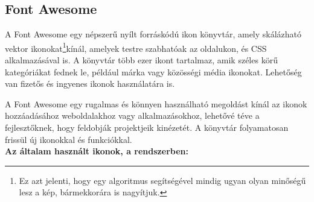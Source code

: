\documentclass[
]{thesis-ekf}
\theoremstyle{definition}
\theoremstyle{remark}
\begin{document}
	\subsection{Font Awesome}
	A Font Awesome egy népszerű nyílt forráskódú ikon könyvtár, amely skálázható vektor ikonokat\footnote{Ez azt jelenti, hogy egy algoritmus segítségével mindig ugyan olyan minőségű lesz a kép, bármekkorára is nagyítjuk.}kínál, amelyek testre szabhatóak az oldalukon, és CSS alkalmazásával is. A könyvtár több ezer ikont tartalmaz, amik széles körű kategóriákat fednek le, például márka vagy közösségi média ikonokat. Lehetőség van fizetős és ingyenes ikonok használatára is.
	
	A Font Awesome egy rugalmas és könnyen használható megoldást kínál az ikonok hozzáadásához weboldalakhoz vagy alkalmazásokhoz, lehetővé téve a fejlesztőknek, hogy feldobják projektjeik kinézetét. A könyvtár folyamatosan frissül új ikonokkal és funkciókkal.\cite{fontawesome}\\
	\textbf{Az általam használt ikonok, a rendszerben:}
\end{document}
